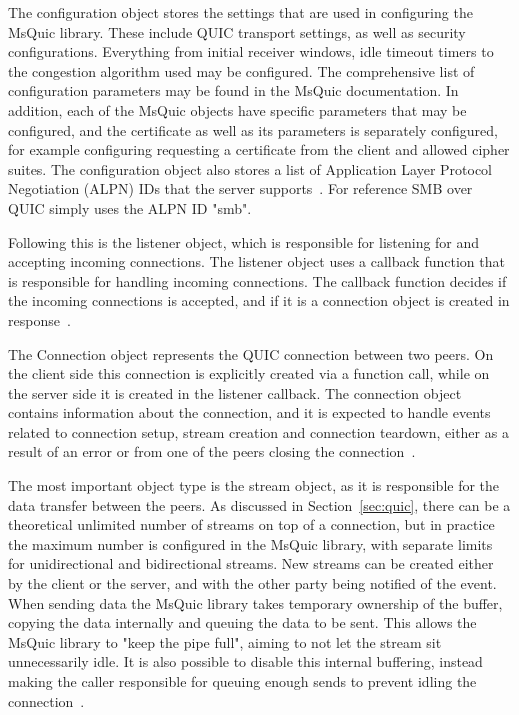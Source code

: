 \documentclass[english, 12pt, a4paper, elec, utf8, a-2b, online]{aaltothesis}
\begin{document}
The configuration object stores the settings that are used in configuring the MsQuic
library. These include QUIC transport settings, as well as security configurations. Everything
from initial receiver windows, idle timeout timers to the congestion algorithm used
may be configured. The comprehensive list of configuration parameters may be found
in the MsQuic documentation. In addition, each of the MsQuic objects have specific
parameters that may be configured, and the certificate as well as its parameters
is separately configured, for example configuring requesting a certificate from the client
and allowed cipher suites. The configuration object also stores a list of
Application Layer Protocol Negotiation (ALPN) IDs that the server supports~\cite{msquic_docs}.
For reference SMB over QUIC simply uses the ALPN ID "smb".

Following this is the listener object, which is responsible for listening for
and accepting incoming connections. The listener object uses a callback function
that is responsible for handling incoming connections. The callback function decides
if the incoming connections is accepted, and if it is a connection object is created
in response~\cite{msquic_docs}.

The Connection object represents the QUIC connection between two peers. On the client
side this connection is explicitly created via a function call, while on the server
side it is created in the listener callback. The connection object contains information
about the connection, and it is expected to handle events related to connection setup,
stream creation and connection teardown, either as a result of an error or from one
of the peers closing the connection~\cite{msquic_docs}.

The most important object type is the stream object, as it is responsible for
the data transfer between the peers. As discussed in Section~\ref{sec:quic}, there
can be a theoretical unlimited number of streams on top of a connection, but in
practice the maximum number is configured in the MsQuic library, with separate
limits for unidirectional and bidirectional streams. New streams can be created
either by the client or the server, and with the other party being notified of
the event. When sending data the MsQuic library takes temporary ownership of the
buffer, copying the data internally and queuing the data to be sent. This allows
the MsQuic library to "keep the pipe full", aiming to not let the stream sit unnecessarily
idle. It is also possible to disable this internal buffering, instead making the
caller responsible for queuing enough sends to prevent idling the connection~\cite{msquic_docs}.
\end{document}
